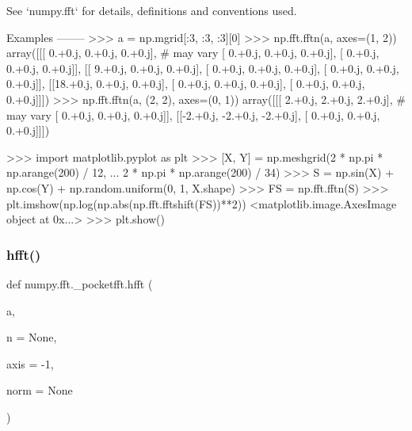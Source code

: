 \begin{DoxyVerb}
See `numpy.fft` for details, definitions and conventions used.

Examples
--------
>>> a = np.mgrid[:3, :3, :3][0]
>>> np.fft.fftn(a, axes=(1, 2))
array([[[ 0.+0.j,   0.+0.j,   0.+0.j], # may vary
        [ 0.+0.j,   0.+0.j,   0.+0.j],
        [ 0.+0.j,   0.+0.j,   0.+0.j]],
       [[ 9.+0.j,   0.+0.j,   0.+0.j],
        [ 0.+0.j,   0.+0.j,   0.+0.j],
        [ 0.+0.j,   0.+0.j,   0.+0.j]],
       [[18.+0.j,   0.+0.j,   0.+0.j],
        [ 0.+0.j,   0.+0.j,   0.+0.j],
        [ 0.+0.j,   0.+0.j,   0.+0.j]]])
>>> np.fft.fftn(a, (2, 2), axes=(0, 1))
array([[[ 2.+0.j,  2.+0.j,  2.+0.j], # may vary
        [ 0.+0.j,  0.+0.j,  0.+0.j]],
       [[-2.+0.j, -2.+0.j, -2.+0.j],
        [ 0.+0.j,  0.+0.j,  0.+0.j]]])

>>> import matplotlib.pyplot as plt
>>> [X, Y] = np.meshgrid(2 * np.pi * np.arange(200) / 12,
...                      2 * np.pi * np.arange(200) / 34)
>>> S = np.sin(X) + np.cos(Y) + np.random.uniform(0, 1, X.shape)
>>> FS = np.fft.fftn(S)
>>> plt.imshow(np.log(np.abs(np.fft.fftshift(FS))**2))
<matplotlib.image.AxesImage object at 0x...>
>>> plt.show()\end{DoxyVerb}
 \mbox{\label{namespacenumpy_1_1fft_1_1__pocketfft_a2f7c39f823dbf6bdf03a10788f66d82b}} 
\subsubsection{\texorpdfstring{hfft()}{hfft()}}
{\footnotesize\ttfamily def numpy.\+fft.\+\_\+pocketfft.\+hfft (\begin{DoxyParamCaption}\item[{}]{a,  }\item[{}]{n = {\ttfamily None},  }\item[{}]{axis = {\ttfamily -\/1},  }\item[{}]{norm = {\ttfamily None} }\end{DoxyParamCaption})}

